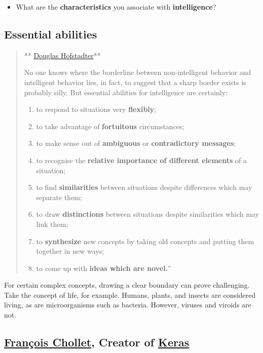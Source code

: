\documentclass[
  letterpaper,
  DIV=11,
  numbers=noendperiod]{scrartcl}
\providecommand{\tightlist}{%
  \setlength{\itemsep}{0pt}\setlength{\parskip}{0pt}}
\begin{document}
\begin{itemize}
\tightlist
\item
  What are the \textbf{characteristics} you associate with
  \textbf{intelligence}?
\end{itemize}

\subsection{Essential abilities}\label{essential-abilities}

\begin{quote}
**
\href{https://cogs.indiana.edu/directory/faculty/profile.php?faculty=dughof}{Douglas
Hofstadter}**

No one knows where the borderline between non-intelligent behavior and
intelligent behavior lies, in fact, to suggest that a sharp border
exists is probably silly. But essential abilities for intelligence are
certainly:

\begin{enumerate}
\def\labelenumi{\arabic{enumi}.}
\tightlist
\item
  to respond to situations very \textbf{flexibly};
\item
  to take advantage of \textbf{fortuitous} circumstances;
\item
  to make sense out of \textbf{ambiguous} or \textbf{contradictory
  messages};
\item
  to recognise the \textbf{relative importance of different elements} of
  a situation;
\item
  to find \textbf{similarities} between situations despite differences
  which may separate them;
\item
  to draw \textbf{distinctions} between situations despite similarities
  which may link them;
\item
  to \textbf{synthesize} new concepts by taking old concepts and putting
  them together in new ways;
\item
  to come up with \textbf{ideas which are novel.}''
\end{enumerate}
\end{quote}

For certain complex concepts, drawing a clear boundary can prove
challenging. Take the concept of life, for example. Humans, plants, and
insects are considered living, as are microorganisms such as bacteria.
However, viruses and viroids are not.

\subsection{\texorpdfstring{\href{https://fchollet.com}{François
Chollet}, Creator of
\href{https://keras.io}{Keras}}{François Chollet, Creator of Keras}}\label{franuxe7ois-chollet-creator-of-keras}
\end{document}
